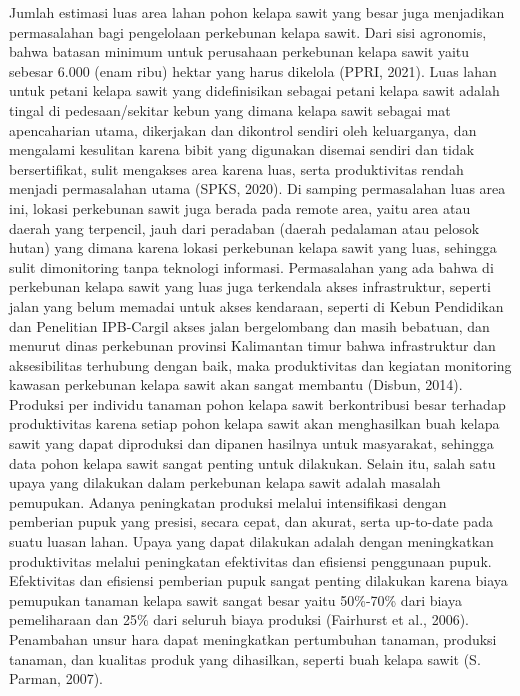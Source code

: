 Jumlah estimasi luas area lahan pohon kelapa sawit yang besar juga menjadikan permasalahan bagi pengelolaan perkebunan kelapa sawit. Dari sisi agronomis, bahwa batasan minimum untuk perusahaan perkebunan kelapa sawit yaitu sebesar 6.000 (enam ribu) hektar yang harus dikelola (PPRI, 2021). Luas lahan untuk petani kelapa sawit yang didefinisikan sebagai petani kelapa sawit adalah tingal di pedesaan/sekitar kebun yang dimana kelapa sawit sebagai mat apencaharian utama, dikerjakan dan dikontrol sendiri oleh keluarganya, dan mengalami kesulitan karena bibit yang digunakan disemai sendiri dan tidak bersertifikat, sulit mengakses area karena luas, serta produktivitas rendah menjadi permasalahan utama (SPKS, 2020). Di samping permasalahan luas area ini, lokasi perkebunan sawit juga berada pada remote area, yaitu area atau daerah yang terpencil, jauh dari peradaban (daerah pedalaman atau pelosok hutan) yang dimana karena lokasi perkebunan kelapa sawit yang luas, sehingga sulit dimonitoring tanpa teknologi informasi. Permasalahan yang ada bahwa di perkebunan kelapa sawit yang luas juga terkendala akses infrastruktur, seperti jalan yang belum memadai untuk akses kendaraan, seperti di Kebun Pendidikan dan Penelitian IPB-Cargil akses jalan bergelombang dan masih bebatuan, dan menurut dinas perkebunan provinsi Kalimantan timur bahwa infrastruktur dan aksesibilitas terhubung dengan baik, maka produktivitas dan kegiatan monitoring kawasan perkebunan kelapa sawit akan sangat membantu (Disbun, 2014). Produksi per individu tanaman pohon kelapa sawit berkontribusi besar terhadap produktivitas karena setiap pohon kelapa sawit akan menghasilkan buah kelapa sawit yang dapat diproduksi dan dipanen hasilnya untuk masyarakat, sehingga data pohon kelapa sawit sangat penting untuk dilakukan. Selain itu, salah satu upaya yang dilakukan dalam perkebunan kelapa sawit adalah masalah pemupukan. Adanya peningkatan produksi melalui intensifikasi dengan pemberian pupuk yang presisi, secara cepat, dan akurat, serta up-to-date pada suatu luasan lahan.  Upaya yang dapat dilakukan adalah dengan meningkatkan produktivitas melalui peningkatan efektivitas dan efisiensi penggunaan pupuk. Efektivitas dan efisiensi pemberian pupuk sangat penting dilakukan karena biaya pemupukan tanaman kelapa sawit sangat besar yaitu 50\%-70\% dari biaya pemeliharaan dan 25\% dari seluruh biaya produksi (Fairhurst et al., 2006). Penambahan unsur hara dapat meningkatkan pertumbuhan tanaman, produksi tanaman, dan kualitas produk yang dihasilkan, seperti buah kelapa sawit (S. Parman, 2007).	

